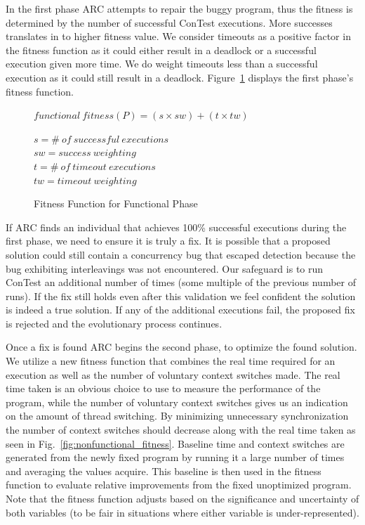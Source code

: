 \documentclass{llncs}
\begin{document}
In the first phase ARC attempts to repair the buggy program, thus the fitness
is determined by the number of successful ConTest executions. More successes
translates in to higher fitness value. We consider timeouts as a positive
factor in the fitness function as it could either result in a deadlock or a
successful execution given more time. We do weight timeouts less than a
successful execution as it could still result in a deadlock.
Figure~\ref{fig:functional_fitness} displays the first phase's fitness
function.

\begin{figure}[h]
\begin{footnotesize}
\begin{center}
$functional\ fitness(P) = (s \times sw) + (t \times tw)$
\end{center}
\end{footnotesize}
\begin{scriptsize}
\begin{center}
$s = \#\ of\ successful\ executions$ \\
$sw = success\ weighting$ \\
$t = \#\ of\ timeout\ executions$ \\
$tw = timeout\ weighting$
\end{center}
\end{scriptsize}
\caption{Fitness Function for Functional Phase}
\label{fig:functional_fitness}
\end{figure}

If ARC finds an individual that achieves 100\% successful executions during the
first phase, we need to ensure it is truly a fix. It is possible that a
proposed solution could still contain a concurrency bug that escaped detection
because the bug exhibiting interleavings was not encountered. Our safeguard is
to run ConTest an additional number of times (some multiple of the previous
number of runs). If the fix still holds even after this validation we feel
confident the solution is indeed a true solution. If any of the additional
executions fail, the proposed fix is rejected and the evolutionary process
continues.

Once a fix is found ARC begins the second phase, to optimize the found
solution. We utilize a new fitness function that combines the real time
required for an execution as well as the number of voluntary context switches
made. The real time taken is an obvious choice to use to measure the
performance of the program, while the number of voluntary context switches
gives us an indication on the amount of thread switching. By minimizing
unnecessary synchronization the number of context switches should decrease
along with the real time taken as seen in Fig.~\ref{fig:nonfunctional_fitness}.
Baseline time and context switches are generated from the newly fixed program
by running it a large number of times and averaging the values acquire. This
baseline is then used in the fitness function to evaluate relative improvements
from the fixed unoptimized program. Note that the fitness function adjusts
based on the significance and uncertainty of both variables (to be fair in
situations where either variable is under-represented).
\end{document}
